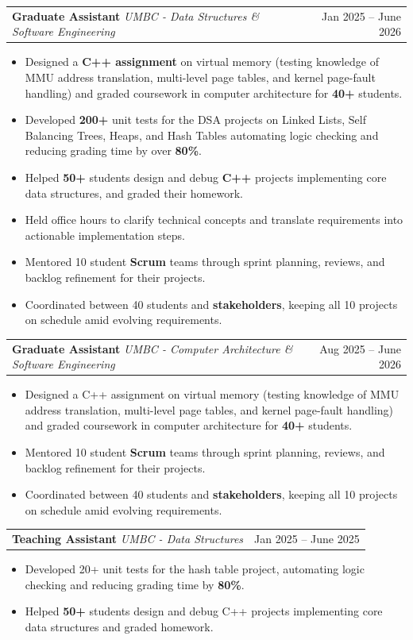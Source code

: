 \documentclass[letterpaper,11pt]{article}
\makeatletter
\newcommand{\BulletItems}[1]{
  \item
    \begin{itemize}[label={-}, leftmargin=*, labelsep=0.3em, topsep=0pt, partopsep=0pt, itemsep=0pt, parsep=0pt]
      \small #1
    \end{itemize}\vspace{-5pt}
}
\newcommand{\SLSubheadingItemThF}[3]{
  \vspace{-2pt}\item
    \begin{tabular*}{0.97\textwidth}[t]{l@{\extracolsep{\fill}}r}
      \textbf{#1} \textbar{} \textit{\small #2} & {\small #3} \\
    \end{tabular*}\vspace{-7pt}
}
\makeatother
\begin{document}
    \SLSubheadingItemThF
      {Graduate Assistant}
      {UMBC - Data Structures \& Software Engineering }
      {Jan 2025 -- June 2026}
    \BulletItems{
      \item Designed a \textbf{C++ assignment} on virtual memory (testing knowledge of MMU address translation, multi-level page tables, and kernel page-fault handling) and graded coursework in computer architecture for \textbf{40+} students.
      \item Developed \textbf{200+} unit tests for the DSA projects on Linked Lists, Self Balancing Trees, Heaps, and Hash Tables automating logic checking and reducing grading time by over \textbf{80\%}.
      \item Helped \textbf{50+} students design and debug \textbf{C++} projects implementing core data structures, and graded their homework.
      \item Held office hours to clarify technical concepts and translate requirements into actionable implementation steps.
      \item Mentored 10 student \textbf{Scrum} teams through sprint planning, reviews, and backlog refinement for their projects.
      \item Coordinated between 40 students and \textbf{stakeholders}, keeping all 10 projects on schedule amid evolving requirements.
     }

    \SLSubheadingItemThF
      {Graduate Assistant}
      {UMBC - Computer Architecture \& Software Engineering }
      {Aug 2025 -- June 2026}
    \BulletItems{
      \item Designed a C++ assignment on virtual memory (testing knowledge of MMU address translation, multi-level page tables, and kernel page-fault handling) and graded coursework in computer architecture for \textbf{40+} students.
      \item Mentored 10 student \textbf{Scrum} teams through sprint planning, reviews, and backlog refinement for their projects.
      \item Coordinated between 40 students and \textbf{stakeholders}, keeping all 10 projects on schedule amid evolving requirements.
    }

    \SLSubheadingItemThF
      {Teaching Assistant}
      {UMBC - Data Structures}
      {Jan 2025 -- June 2025}
    \BulletItems{
      \item Developed 20+ unit tests for the hash table project, automating logic checking and reducing grading time by \textbf{80\%}.
      \item Helped \textbf{50+} students design and debug C++ projects implementing core data structures and graded homework.
    }
    
\end{document}
